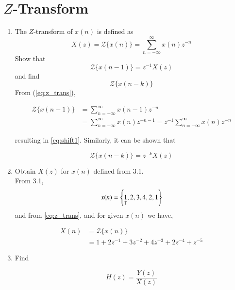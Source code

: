 \documentclass[journal,12pt,twocolumn]{IEEEtran}
\renewcommand\thesection{\arabic{section}}
\begin{document}
\section{$Z$-Transform}
\begin{enumerate}[label=\thesection.\arabic*,ref=\thesection.\theenumi]

\item The $Z$-transform of $x(n)$ is defined as
\begin{equation}
\label{eq:z_trans}
X(z)={\mathcal {Z}}\{x(n)\}=\sum _{n=-\infty }^{\infty }x(n)z^{-n}
\end{equation}
Show that
\begin{equation}
\label{eq:shift1}
{\mathcal {Z}}\{x(n-1)\} = z^{-1}X(z)
\end{equation}
and find
\begin{equation}
	{\mathcal {Z}}\{x(n-k)\} 
\end{equation}
\solution From (\ref{eq:z_trans}),

\begin{align}
{\mathcal {Z}}\{x(n-1)\} & =\sum _{n=-\infty }^{\infty }x(n-1)z^{-n}\\
&= \sum _{n=-\infty }^{\infty }x(n)z^{-n-1} = z^{-1}\sum _{n=-\infty }^{\infty }x(n)z^{-n}
\end{align}

resulting in \eqref{eq:shift1}. Similarly, it can be shown that

\begin{equation}
\label{eq:z_trans_shift}
	{\mathcal {Z}}\{x(n-k)\} = z^{-k}X(z)
\end{equation}

\item Obtain $X(z)$ for $x(n)$ defined from 3.1.\\

\solution From 3.1,
\begin{align*}
x(n) = \left\{\underset{\uparrow}{1},2,3,4,2,1\right\}
\end{align*}
and from \eqref{eq:z_trans}, and for given $x(n)$ we have,

\begin{align}
X(n) &= {\mathcal{Z}}\{x(n)\}\\
&= 1 + 2z^{-1} + 3z^{-2} + 4z^{-3} + 2z^{-4} + z^{-5}
\end{align}



\item Find

\begin{equation}
\label{eq:hzz}
H(z) = \frac{Y(z)}{X(z)}
\end{equation}


\end{enumerate}
\end{document}
